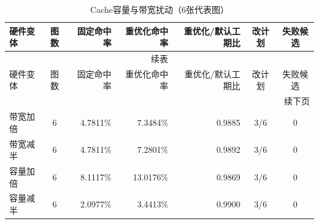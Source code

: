 \begin{longtable}{lcrrrcc}
\caption{Cache容量与带宽扰动（6张代表图）}\label{tab:v7-sensitivity}\\
\toprule
硬件变体 & 图数 & 固定命中率 & 重优化命中率 & 重优化/默认工期比 & 改计划 & 失败候选 \\
\midrule
\endfirsthead
\multicolumn{7}{c}{续表}\\
\toprule
硬件变体 & 图数 & 固定命中率 & 重优化命中率 & 重优化/默认工期比 & 改计划 & 失败候选 \\
\midrule
\endhead
\midrule\multicolumn{7}{r}{续下页}\\
\endfoot
\bottomrule
\endlastfoot
带宽加倍 & 6 & 4.7811\% & 7.3484\% & 0.9885 & 3/6 & 0 \\
带宽减半 & 6 & 4.7811\% & 7.2801\% & 0.9892 & 3/6 & 0 \\
容量加倍 & 6 & 8.1117\% & 13.0176\% & 0.9869 & 3/6 & 0 \\
容量减半 & 6 & 2.0977\% & 3.4413\% & 0.9900 & 3/6 & 0 \\
\end{longtable}
